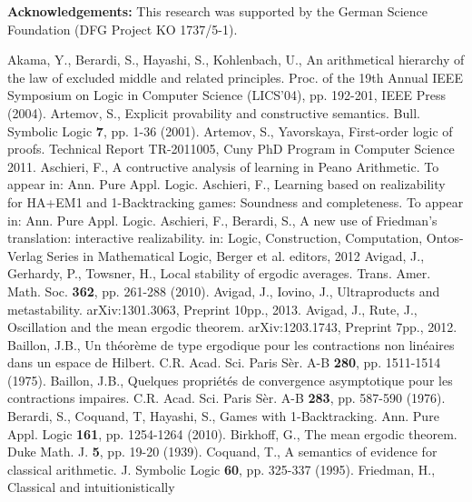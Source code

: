 \documentclass[1p]{elsarticle}
\theoremstyle{plain}
\theoremstyle{definition}
\theoremstyle{remark}
\theoremstyle{definition}
\begin{document}
{{\bf Acknowledgements:} 
This research was supported by the German Science Foundation (DFG Project KO 1737/5-1). 

\vspace*{-3mm}
\begin{thebibliography}{00}
 Akama, Y., Berardi, S., Hayashi, S., Kohlenbach, U., 
An arithmetical hierarchy of the law of excluded middle and related 
principles. Proc. of the 19th Annual IEEE Symposium on Logic in 
Computer Science (LICS'04), pp. 192-201, IEEE Press (2004).
 Artemov, S., Explicit provability and
constructive semantics. Bull. Symbolic Logic {\bf 7}, pp. 1-36 (2001).
 Artemov, S., Yavorskaya, First-order logic of proofs. 
Technical Report TR-2011005, Cuny PhD Program in Computer Science 2011.
 Aschieri, F., A contructive analysis of learning 
in Peano Arithmetic. To appear in: Ann. Pure Appl. Logic.
 Aschieri, F., Learning based on realizability 
for HA+EM1 and 1-Backtracking games: Soundness and completeness. 
To appear in: Ann. Pure Appl. Logic.
 Aschieri, F., Berardi, S., 
A new use of Friedman's translation: interactive realizability.  
in: Logic, Construction, Computation, Ontos-Verlag Series in 
Mathematical 
Logic, Berger et al. editors, 2012
 Avigad, J., Gerhardy, P., Towsner, H., 
Local stability of ergodic averages. Trans. Amer. 
Math. Soc. {\bf 362}, pp. 261-288 (2010). 
 Avigad, J., Iovino, J., Ultraproducts and 
metastability. arXiv:1301.3063, Preprint 10pp., 2013.
 Avigad, J., Rute, J., Oscillation and the 
mean ergodic theorem. arXiv:1203.1743, Preprint 7pp., 2012.
 Baillon, J.B., Un th\'eor\`eme de type ergodique 
pour les contractions non lin\'eaires dans un espace de Hilbert. 
C.R. Acad. 
Sci. Paris S\`er. A-B {\bf 280}, pp. 1511-1514 (1975).
 Baillon, J.B., Quelques propri\'et\'es de 
convergence asymptotique pour les contractions impaires. 
C.R. Acad. Sci. Paris S\`er. A-B {\bf 283}, pp. 587-590 (1976). 
 Berardi, S., Coquand, T, Hayashi, S., 
Games with 1-Backtracking. Ann. Pure Appl. Logic {\bf 161}, pp. 
1254-1264 (2010).
 Birkhoff, G., 
The mean ergodic theorem. Duke Math. J. {\bf 5}, pp. 19-20 (1939). 
 Coquand, T., A semantics of evidence for classical
arithmetic. J. Symbolic Logic {\bf 60}, pp. 325-337 (1995).
 Friedman, H., Classical and intuitionistically

\end{thebibliography}}
\end{document}
